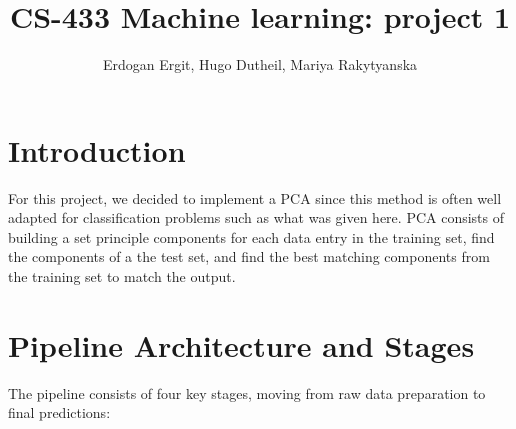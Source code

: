 \documentclass[11pt, a4paper]{article}
\title{CS-433 Machine learning: project 1}
\author{Erdogan Ergit, Hugo Dutheil, Mariya Rakytyanska}
\date{}
\begin{document}
\maketitle

\section{Introduction}
For this project, we decided to implement a PCA since this method is often well adapted for classification problems such as what was given here. PCA consists of building a set principle components for each data entry in the training set, find the components of a the test set, and find the best matching components from the training set to match the output.

\section{Pipeline Architecture and Stages}

The pipeline consists of four key stages, moving from raw data preparation to final predictions:
\end{document}
